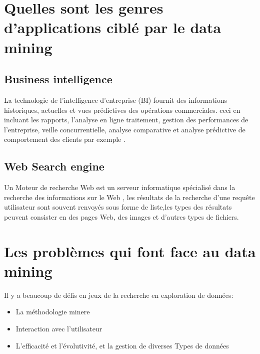 \documentclass[12pt,a4paper,oneside]{book}
\begin{document}
    \section{Quelles sont les genres d'applications ciblé par le data mining}
     \subsection{Business intelligence}
     La technologie de l'intelligence d'entreprise  (BI) fournit des informations historiques, actuelles et
     vues prédictives des opérations commerciales. 
     ceci en incluant les rapports, l'analyse en ligne
     traitement, gestion des performances de l'entreprise, veille concurrentielle, analyse comparative et analyse prédictive de comportement des clients par exemple .
     \subsection{Web  Search engine }
     Un Moteur de recherche Web est un serveur informatique spécialisé dans la recherche des informations sur le Web , les résultats de la recherche d’une requête utilisateur sont souvent renvoyés sous forme de liste,les types des résultats peuvent consister en des pages Web, des images et d’autres types de fichiers.
    \section{Les problèmes qui font face au data mining}
    Il y a beaucoup de défis en jeux de la recherche en exploration de données:
    \begin{itemize}
    \item  La méthodologie minere
    \item Interaction avec l'utilisateur
    \item  L'efficacité et l'évolutivité, et la gestion de diverses Types de données
    \end{itemize}
 

	\tableofcontents
\end{document}
